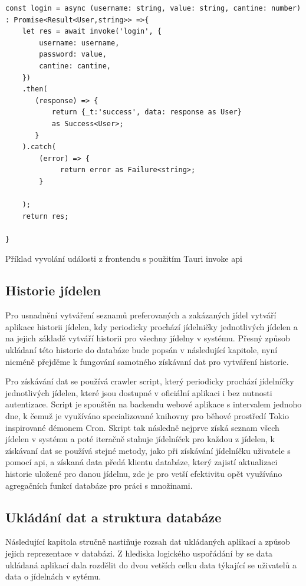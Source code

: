 \documentclass[12pt]{article}
\begin{document}
\begin{listing}[!ht]
\begin{verbatim}
const login = async (username: string, value: string, cantine: number) 
: Promise<Result<User,string>> =>{
    let res = await invoke('login', {
        username: username,
        password: value,
        cantine: cantine,
    })
    .then(
       (response) => {
           return {_t:'success', data: response as User} 
           as Success<User>;
       }
    ).catch(
        (error) => {
             return error as Failure<string>;
        }
        
    );
    return res; 
    
}
\end{verbatim}
\caption{Příklad vyvolání události z frontendu s použitím Tauri invoke api}
\end{listing}

\subsection{Historie jídelen}
Pro usnadnění vytváření seznamů preferovaných a zakázaných jídel vytváří aplikace historii jídelen, kdy periodicky prochází jídelničky jednotlivých jídelen a na jejich základě vytváří historii pro všechny jídelny v systému. Přesný způsob ukládaní této historie do databáze bude popsán v následující kapitole, nyní nicméně přejděme k fungování samotného získávaní dat pro vytváření historie.

Pro získávání dat se používá crawler script, který periodicky prochází jídelníčky jednotlivých jídelen, které jsou dostupné v oficiální aplikaci i bez nutnosti autentizace. Script je spouštěn na backendu webové aplikace s intervalem jednoho dne, k čemuž je využíváno specializované knihovny pro běhové prostředí Tokio inspirované démonem Cron\cite{cron}. Skript tak následně nejprve získá seznam všech jídelen v systému a poté iteračně stahuje jídelníček pro každou z jídelen, k získávaní dat se používá stejné metody, jako při získávání jídelníčku uživatele s pomocí api, a získaná data předá klientu databáze, který zajistí aktualizaci historie uložené pro danou jídelnu, zde je pro vetší efektivitu opět využíváno agregačních funkcí databáze pro práci s množinami.
\subsection{Ukládání dat a struktura databáze}
Následující kapitola stručně nastiňuje rozsah dat ukládaných aplikací a způsob jejich reprezentace v databázi. Z hlediska logického uspořádání by se data ukládaná aplikací dala rozdělit do dvou vetších celku data týkající se uživatelů a data o jídelnách v sytému. 
\end{document}
